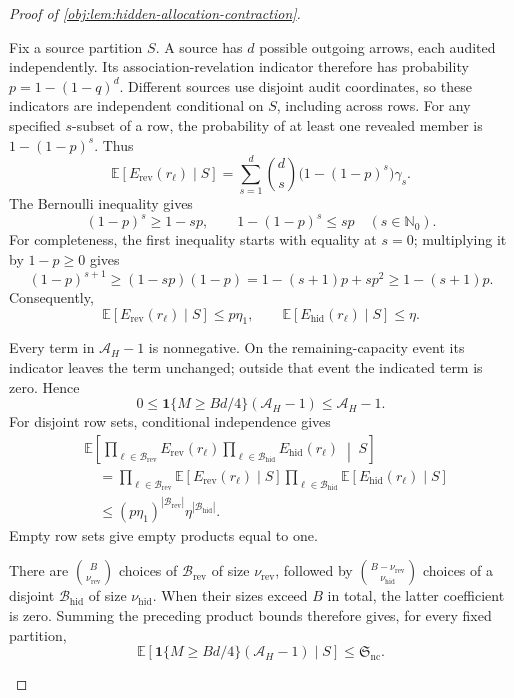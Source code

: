 \documentclass[11pt]{article}
\begin{document}
\begin{proof}[Proof of \cref{obj:lem:hidden-allocation-contraction}]
\begin{enumerate}
Fix a source partition \(S\). A source has \(d\) possible outgoing arrows, each audited independently. Its association-revelation indicator therefore has probability \(p=1-(1-q)^d\). Different sources use disjoint audit coordinates, so these indicators are independent conditional on \(S\), including across rows. For any specified \(s\)-subset of a row, the probability of at least one revealed member is \(1-(1-p)^s\). Thus
\[
\mathbb E\!\left[E_{\mathrm{rev}}(r_\ell)\mid S\right]
=
\sum_{s=1}^d
\binom ds\bigl(1-(1-p)^s\bigr)\gamma_s.
\]
The Bernoulli inequality gives
\[
(1-p)^s\ge1-sp,
\qquad
1-(1-p)^s\le sp
\quad(s\in\mathbb N_0).
\]
For completeness, the first inequality starts with equality at \(s=0\); multiplying it by \(1-p\ge0\) gives
\[
(1-p)^{s+1}
\ge(1-sp)(1-p)
=1-(s+1)p+sp^2
\ge1-(s+1)p.
\]
Consequently,
\[
\mathbb E\!\left[E_{\mathrm{rev}}(r_\ell)\mid S\right]
\le p\eta_1,
\qquad
\mathbb E\!\left[E_{\mathrm{hid}}(r_\ell)\mid S\right]
\le\eta.
\]

Every term in \(\mathcal A_H-1\) is nonnegative. On the remaining-capacity event its indicator leaves the term unchanged; outside that event the indicated term is zero. Hence
\[
0\le
\mathbf1\{M\ge Bd/4\}(\mathcal A_H-1)
\le\mathcal A_H-1.
\]
For disjoint row sets, conditional independence gives
\[
\begin{aligned}
&\mathbb E\!\left[
\prod_{\ell\in\mathcal B_{\mathrm{rev}}}E_{\mathrm{rev}}(r_\ell)
\prod_{\ell\in\mathcal B_{\mathrm{hid}}}E_{\mathrm{hid}}(r_\ell)
\;\middle|\;S
\right]
\\
&\quad=
\prod_{\ell\in\mathcal B_{\mathrm{rev}}}
\mathbb E[E_{\mathrm{rev}}(r_\ell)\mid S]
\prod_{\ell\in\mathcal B_{\mathrm{hid}}}
\mathbb E[E_{\mathrm{hid}}(r_\ell)\mid S]
\\
&\quad\le
(p\eta_1)^{|\mathcal B_{\mathrm{rev}}|}
\eta^{|\mathcal B_{\mathrm{hid}}|}.
\end{aligned}
\]
Empty row sets give empty products equal to one.

There are
\(\binom B{\nu_{\mathrm{rev}}}\) choices of
\(\mathcal B_{\mathrm{rev}}\) of size \(\nu_{\mathrm{rev}}\), followed by
\(\binom{B-\nu_{\mathrm{rev}}}{\nu_{\mathrm{hid}}}\) choices of a disjoint
\(\mathcal B_{\mathrm{hid}}\) of size \(\nu_{\mathrm{hid}}\).
When their sizes exceed \(B\) in total, the latter coefficient is zero.
Summing the preceding product bounds therefore gives, for every fixed partition,
\[
\mathbb E\!\left[
\mathbf1\{M\ge Bd/4\}(\mathcal A_H-1)
\mid S
\right]
\le\mathfrak S_{\mathrm{nc}}.
\]


\end{enumerate}
\end{proof}
\end{document}

